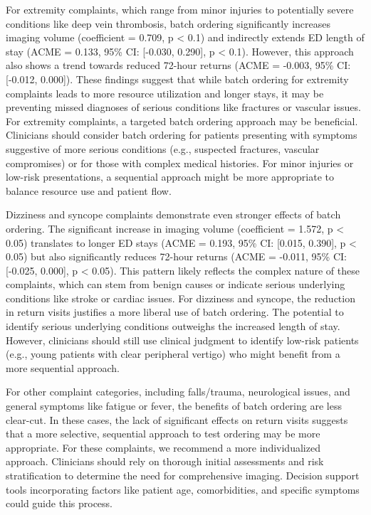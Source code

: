 \documentclass{article}
\begin{document}
For extremity complaints, which range from minor injuries to potentially
severe conditions like deep vein thrombosis, batch ordering
significantly increases imaging volume (coefficient = 0.709, p
\textless{} 0.1) and indirectly extends ED length of stay (ACME = 0.133,
95\% CI: {[}-0.030, 0.290{]}, p \textless{} 0.1). However, this approach
also shows a trend towards reduced 72-hour returns (ACME = -0.003, 95\%
CI: {[}-0.012, 0.000{]}). These findings suggest that while batch
ordering for extremity complaints leads to more resource utilization and
longer stays, it may be preventing missed diagnoses of serious
conditions like fractures or vascular issues. For extremity complaints,
a targeted batch ordering approach may be beneficial. Clinicians should
consider batch ordering for patients presenting with symptoms suggestive
of more serious conditions (e.g., suspected fractures, vascular
compromises) or for those with complex medical histories. For minor
injuries or low-risk presentations, a sequential approach might be more
appropriate to balance resource use and patient flow.

Dizziness and syncope complaints demonstrate even stronger effects of
batch ordering. The significant increase in imaging volume (coefficient
= 1.572, p \textless{} 0.05) translates to longer ED stays (ACME =
0.193, 95\% CI: {[}0.015, 0.390{]}, p \textless{} 0.05) but also
significantly reduces 72-hour returns (ACME = -0.011, 95\% CI:
{[}-0.025, 0.000{]}, p \textless{} 0.05). This pattern likely reflects
the complex nature of these complaints, which can stem from benign
causes or indicate serious underlying conditions like stroke or cardiac
issues. For dizziness and syncope, the reduction in return visits
justifies a more liberal use of batch ordering. The potential to
identify serious underlying conditions outweighs the increased length of
stay. However, clinicians should still use clinical judgment to identify
low-risk patients (e.g., young patients with clear peripheral vertigo)
who might benefit from a more sequential approach.

For other complaint categories, including falls/trauma, neurological
issues, and general symptoms like fatigue or fever, the benefits of
batch ordering are less clear-cut. In these cases, the lack of
significant effects on return visits suggests that a more selective,
sequential approach to test ordering may be more appropriate. For these
complaints, we recommend a more individualized approach. Clinicians
should rely on thorough initial assessments and risk stratification to
determine the need for comprehensive imaging. Decision support tools
incorporating factors like patient age, comorbidities, and specific
symptoms could guide this process.
\end{document}
